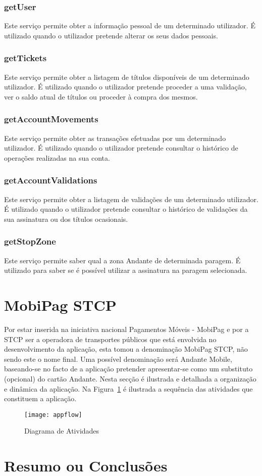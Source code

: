\subsubsection{getUser}

Este serviço permite obter a informação pessoal de um determinado utilizador. É utilizado quando o utilizador pretende alterar os seus dados pessoais.

\subsubsection{getTickets}

Este serviço permite obter a listagem de títulos disponíveis de um determinado utilizador. É utilizado quando o utilizador pretende proceder a uma validação, ver o saldo atual de títulos ou proceder à compra dos mesmos.

\subsubsection{getAccountMovements}

Este serviço permite obter as transações efetuadas por um determinado utilizador. É utilizado quando o utilizador pretende consultar o histórico de operações realizadas na sua conta.

\subsubsection{getAccountValidations}

Este serviço permite obter a listagem de validações de um determinado utilizador. É utilizado quando o utilizador pretende consultar o histórico de validações da sua assinatura ou dos títulos ocasionais.

\subsubsection{getStopZone}

Este serviço permite saber qual a zona Andante de determinada paragem. É utilizado para saber se é possível utilizar a assinatura na paragem selecionada.

\section{MobiPag STCP}

Por estar inserida na iniciativa nacional Pagamentos Móveis - MobiPag \cite{cedt} e por a STCP ser a operadora de transportes públicos que está envolvida no desenvolvimento da aplicação, esta tomou a denominação MobiPag STCP, não sendo este o nome final. Uma possível denominação será Andante Mobile, baseando-se no facto de a aplicação pretender apresentar-se como um substituto (opcional) do cartão Andante.
Nesta secção é ilustrada e detalhada a organização e dinâmica da aplicação. Na Figura~\ref{fig:appflow} é ilustrada a sequência das atividades que constituem a aplicação.

\begin{figure}[t]
  \begin{center}
    \leavevmode
    \texttt{[image: appflow]}
    \caption{Diagrama de Atividades}
    \label{fig:appflow}
  \end{center}
\end{figure}

\section{Resumo ou Conclusões}